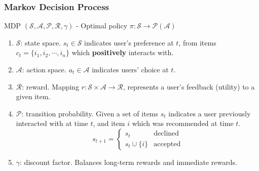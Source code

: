 \documentclass{../presentation}
\begin{document}
    \begin{frame}
        \frametitle{Markov Decision Process}

        MDP $(\mathcal S, \mathcal A, \mathcal P, \mathcal R, \gamma)$ - Optimal policy $\pi: \mathcal S\rightarrow \mathcal P(\mathcal A)$

        \begin{enumerate}
            \item $\mathcal S$: state space. $s_t \in \mathcal S$ indicates user's preference at $t$, from items $c_t = \{i_1, i_2, \cdots, i_n\}$ which \textbf{positively} interacts with.
            \item $\mathcal A$: action space. $a_t \in \mathcal A$ indicates users' choice at $t$.
            \item $\mathcal R$: reward. Mapping $r: \mathcal S\times \mathcal A\rightarrow \mathcal R$, represents a user's feedback (utility) to a given item.
            \item $\mathcal P$: transition probability. Given a set of items $s_t$ indicates a user previously interacted with at time $t$, and item $i$ which was recommended at time $t$.
            \begin{equation}
                s_{t+1} = \begin{cases}
                    s_t & \text{declined} \\
                    s_t \cup \{i\} & \text{accepted}
                \end{cases}
            \end{equation}
            \item $\gamma$: discount factor. Balances long-term rewards and immediate rewards.
        \end{enumerate}

    \end{frame}
\end{document}
